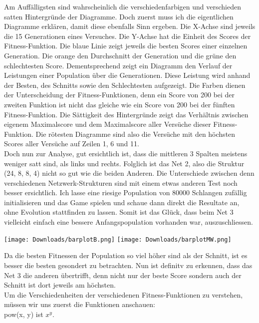 \documentclass[10pt,a4paper,ngerman,english]{article}
\begin{document}
Am Auffälligsten sind wahrscheinlich die verschiedenfarbigen und verschieden satten Hintergründe der Diagramme. Doch zuerst muss ich die eigentlichen Diagramme erklären, damit diese ebenfalls Sinn ergeben. Die X-Achse sind jeweils die 15 Generationen eines Versuches. Die Y-Achse hat die Einheit des Scores der Fitness-Funktion. Die blaue Linie zeigt jeweils die besten Scores einer einzelnen Generation. Die orange den Durchschnitt der Generation und die grüne den schlechtesten Score. Dementsprechend zeigt ein Diagramm den Verlauf der Leistungen einer Population über die Generationen. Diese Leistung wird anhand der Besten, des Schnitts sowie den Schlechtesten aufgezeigt. Die Farben dienen der Unterscheidung der Fitness-Funktionen, denn ein Score von 200 bei der zweiten Funktion ist nicht das gleiche wie ein Score von 200 bei der fünften Fitness-Funktion. Die Sättigkeit des Hintergründe zeigt das Verhältnis zwischen eigenem Maximalscore und dem Maximalscore aller Versüche dieser Fitness-Funktion. Die rötesten Diagramme sind also die Versüche mit den höchsten Scores aller Versüche auf Zeilen 1, 6 und 11.\\

Doch nun zur Analyse, gut ersichtlich ist, dass die mittleren 3 Spalten meistens weniger satt sind, als links und rechts. Folglich ist das Net 2, also die Struktur (24, 8, 8, 4) nicht so gut wie die beiden Anderen. Die Unterschiede zwischen denn verschiedenen Netzwerk-Strukturen sind mit einem etwas anderen Test noch besser ersichtlich. Ich lasse eine riesige Population von 80000 Schlangen zufällig initialisieren und das Game spielen und schaue dann direkt die Resultate an, ohne Evolution stattfinden zu lassen. Somit ist das Glück, dass beim Net 3 vielleicht einfach eine bessere Anfangspopulation vorhanden war, auszuschliessen.

\begin{center}
    \texttt{[image: Downloads/barplotB.png]}
    \texttt{[image: Downloads/barplotMW.png]}
\end{center}

Da die besten Fitnessen der Population so viel höher sind als der Schnitt, ist es besser die besten gesondert zu betrachten. Nun ist definitv zu erkennen, dass das Net 3 die anderen übertrifft, denn nicht nur der beste Score sondern auch der Schnitt ist dort jeweils am höchsten.\\

Um die Verschiedenheiten der verschiedenen Fitness-Funktionen zu verstehen, müssen wir uns zuerst die Funktionen anschauen:\\
pow(x, y) ist $x^y$.
\end{document}

